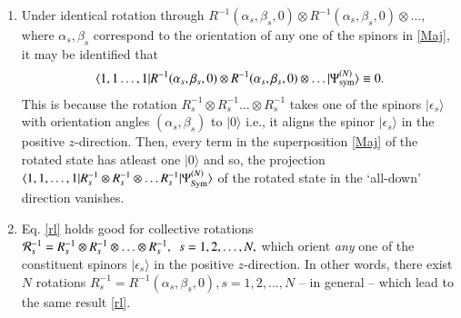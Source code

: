 {\begin{enumerate}
\item Under identical rotation through $R^{-1}(\alpha_s,\beta_s,0)\otimes R^{-1}(\alpha_s,\beta_s,0)\otimes \ldots  $, where $\alpha_s, \beta_s$ correspond to the orientation of any one of the spinors in \eqref{Maj}, it may be identified that 
\begin{equation}
\langle 1,1\ldots , 1\vert R^{-1}(\alpha_s,\beta_s,0)\otimes R^{-1}(\alpha_s,\beta_s,0)\otimes 
\ldots   \vert \Psi^{(N)}_{\rm sym}\rangle\equiv 0.\label{rl}
\end{equation}
This is because the rotation $R_s^{-1}\otimes R_s^{-1}\ldots \otimes R_s^{-1}$ takes one of the spinors $\vert \epsilon_s\rangle$ with orientation angles $(\alpha_s, \beta_s)$ to $\vert 0\rangle$ i.e., it aligns the spinor $\vert \epsilon_s\rangle$ in the positive $z$-direction. Then, every   term in the  superposition \eqref{Maj} of the rotated state has atleast one $\vert 0\rangle$ and so, the projection $\langle 1,1,\ldots, 1\vert R_s^{-1}\otimes R_s^{-1}\otimes \ldots R_s^{-1}\vert \Psi^{(N)}_{\rm Sym}\rangle$ of the rotated state in the `all-down' direction vanishes. 

\item Eq. \eqref{rl} holds good for  collective rotations ${\cal R}_s^{-1}=R^{-1}_s\otimes R^{-1}_s\otimes\ldots\otimes R^{-1}_s,\ \ s=1,2,\ldots, N,$ which orient {\em any} one of the constituent spinors $\vert\epsilon_s\rangle$ in the positive $z$-direction. In other words, there exist $N$ rotations $R^{-1}_s=R^{-1}(\alpha_s,\beta_s,0), s=1,2,\ldots , N$ -- in general -- which lead to the same result  \eqref{rl}.
\end{enumerate}



}
